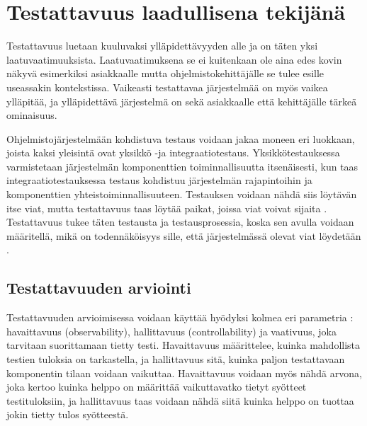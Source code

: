 \documentclass[finnish]{tktltiki2}
\theoremstyle{definition}
\theoremstyle{remark}
\begin{document}
\section{Testattavuus laadullisena tekijänä}
Testattavuus luetaan kuuluvaksi ylläpidettävyyden alle \citep{ISO/IEC25010:2011} ja on täten yksi laatuvaatimuuksista. Laatuvaatimuksena se ei kuitenkaan ole aina edes kovin näkyvä esimerkiksi asiakkaalle mutta ohjelmistokehittäjälle se tulee esille useassakin kontekstissa. Vaikeasti testattavaa järjestelmää on myös vaikea ylläpitää, ja ylläpidettävä järjestelmä on sekä asiakkaalle että kehittäjälle tärkeä ominaisuus.

Ohjelmistojärjestelmään kohdistuva testaus voidaan jakaa moneen eri luokkaan, joista kaksi yleisintä ovat yksikkö -ja integraatiotestaus. Yksikkötestauksessa varmistetaan järjestelmän komponenttien toiminnallisuutta itsenäisesti, kun taas integraatiotestauksessa testaus kohdistuu järjestelmän rajapintoihin ja komponenttien yhteistoiminnallisuuteen. Testauksen voidaan nähdä siis löytävän itse viat, mutta testattavuus taas löytää paikat, joissa viat voivat sijaita \citep[s. 19]{Voas:1995:STN:624607.625469}. Testattavuus tukee täten testausta ja testausprosessia, koska sen avulla voidaan määritellä, mikä on todennäköisyys sille, että järjestelmässä olevat viat löydetään \citep[s. 114]{voas_improving_1992}. 


\subsection{Testattavuuden arviointi} \label{contro_and_observ}

Testattavuuden arvioimisessa voidaan käyttää hyödyksi kolmea eri parametria \citep[s. 2]{baudry_measuring_2003}: havaittavuus (observability), hallittavuus (controllability) ja vaativuus, joka tarvitaan suorittamaan tietty testi. Havaittavuus määrittelee, kuinka mahdollista testien tuloksia on tarkastella, ja hallittavuus sitä, kuinka paljon testattavaan komponentin tilaan voidaan vaikuttaa. Havaittavuus voidaan myös nähdä arvona, joka kertoo kuinka helppo on määrittää vaikuttavatko tietyt syötteet testituloksiin, ja hallittavuus taas voidaan nähdä siitä kuinka helppo on tuottaa jokin tietty tulos syötteestä. %

\end{document}
